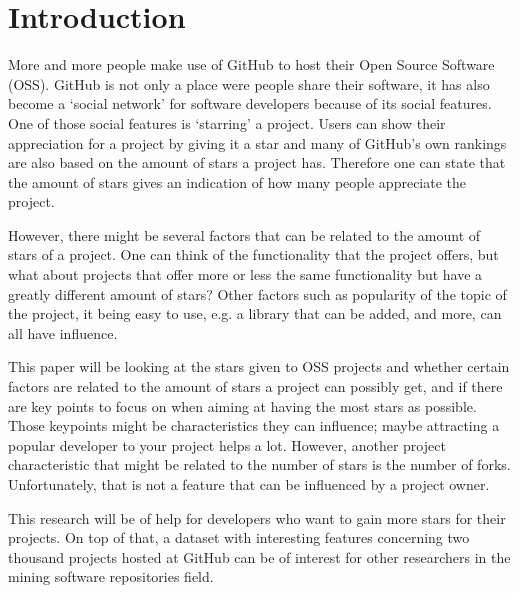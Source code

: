 \section{Introduction}
    More and more people make use of GitHub to host their Open Source Software (OSS)\cite{github-2013}. 
    GitHub is not only a place were people share their software, it has also become a `social network' for software developers because of its social features. \cite{dabbish-2012} 
    One of those social features is `starring' a project. Users can show their appreciation for a project by giving it a  star and many of GitHub's own rankings are also based on the amount of stars a project has.\cite{github-stars-2016} 
    Therefore one can state that the amount of stars gives an indication of how many people appreciate the project.
    
    However, there might be several factors that can be related to the amount of stars of a project. 
    One can think of the functionality that the project offers, but what about projects that offer more or less the same functionality but have a greatly different amount of stars? Other factors such as popularity of the topic of the project, it being easy to use, e.g. a library that can be added, and more, can all have influence.
    
    This paper will be looking at the stars given to OSS projects and whether certain factors are related to the amount of stars a project can possibly get, and if there are key points to focus on when aiming at having the most stars as possible.
    Those keypoints might be characteristics they can influence; maybe attracting a popular developer to your project helps a lot. However, another project characteristic that might be related to the number of stars is the number of forks. 
    Unfortunately, that is not a feature that can be influenced by a project owner.
    
    This research will be of help for developers who want to gain more stars for their projects.
    On top of that, a dataset with interesting features concerning two thousand projects hosted at GitHub can be of interest for other researchers in the mining software repositories field.
    


